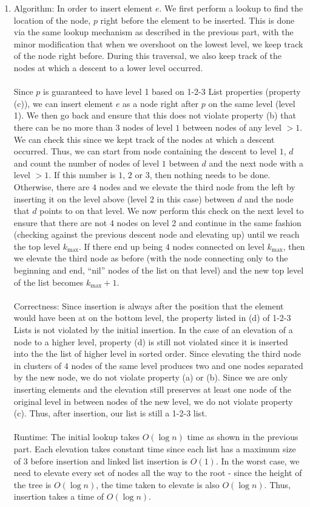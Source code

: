 \documentclass{article}
\theoremstyle{casestyle}
\begin{document}
\begin{enumerate}[i]
\item Algorithm: In order to insert element $e$. We first perform a lookup to find the location of the node, $p$ right before the element to be inserted. This is done via the same lookup mechanism as described in the previous part, with the minor modification that when we overshoot on the lowest level, we keep track of the node right before. During this traversal, we also keep track of the nodes at which a descent to a lower level occurred. \\\\ Since $p$ is guaranteed to have level 1 based on 1-2-3 List properties (property (c)), we can insert element $e$ as a node right after $p$ on the same level (level 1). We then go back and ensure that this does not violate property (b) that there can be no more than $3$ nodes of level $1$ between nodes of any level $>1$. We can check this since we kept track of the nodes at which a descent occurred. Thus, we can start from node containing the descent to level $1$, $d$ and count the number of nodes of level $1$ between $d$ and the next node with a level $>1$. If this number is $1$, $2$ or $3$, then nothing needs to be done. Otherwise, there are $4$ nodes and we elevate the third node from the left by inserting it on the level above (level 2 in this case) between $d$ and the node that $d$ points to on that level. We now perform this check on the next level to ensure that there are not $4$ nodes on level 2 and continue in the same fashion (checking against the previous descent node and elevating up) until we reach the top level $k_{\max}$. If there end up being $4$ nodes connected on level $k_{\max}$, then we elevate the third node as before (with the node connecting only to the beginning and end, ``nil'' nodes of the list on that level) and the new top level of the list becomes $k_{\max}+1$.
\\\\ Correctness: Since insertion is always after the position that the element would have been at on the bottom level, the property listed in (d) of 1-2-3 Lists is not violated by the initial insertion. In the case of an elevation of a node to a higher level, property (d) is still not violated since it is inserted into the the list of higher level in sorted order. Since elevating the third node in clusters of $4$ nodes of the same level produces two and one nodes separated by the new node, we do not violate property (a) or (b). Since we are only inserting elements and the elevation still preserves at least one node of the original level in between nodes of the new level, we do not violate property (c). Thus, after insertion, our list is still a 1-2-3 list.
\\\\ Runtime: The initial lookup takes $O(\log n)$ time as shown in the previous part. Each elevation takes constant time since each list has a maximum size of $3$ before insertion and linked list insertion is $O(1)$. In the worst case, we need to elevate every set of nodes all the way to the root - since the height of the tree is $O(\log n)$, the time taken to elevate is also $O(\log n)$. Thus, insertion takes a time of $O(\log n)$.


\end{enumerate}
\end{document}
